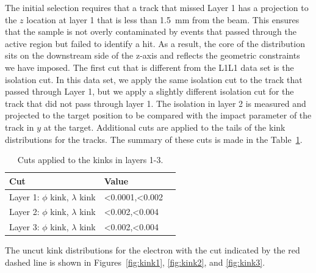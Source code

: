 The initial selection requires that a track that missed Layer 1 has a projection to the $z$ location at layer 1 that is less than 1.5~mm from the beam. This ensures that the sample is not overly contaminated by events that passed through the active region but failed to identify a hit. As a result, the core of the distribution sits on the downstream side of the z-axis and reflects the geometric constraints we have imposed. The first cut that is different from the L1L1 data set is the isolation cut. In this data set, we apply the same isolation cut to the track that passed through Layer 1, but we apply a slightly different isolation cut for the track that did not pass through layer 1. The isolation in layer 2 is measured and projected to the target position to be compared with the impact parameter of the track in $y$ at the target. Additional cuts are applied to the tails of the kink distributions for the tracks. The summary of these cuts is made in the Table~\ref{kink_cuts}.

\begin{table}[H]
\caption{Cuts applied to the kinks in layers 1-3.}
\label{kink_cuts}
\centering
\begin{tabular}{lll}
\toprule
Cut & Value \\
\midrule
Layer 1: $\phi$ kink, $\lambda$ kink & <0.0001,<0.002\\
Layer 2: $\phi$ kink, $\lambda$ kink & <0.002,<0.004\\
Layer 3: $\phi$ kink, $\lambda$ kink & <0.002,<0.004\\
\bottomrule
\end{tabular}
\end{table}

The uncut kink distributions for the electron with the cut indicated by the red dashed line is shown in Figures~\ref{fig:kink1}, \ref{fig:kink2}, and \ref{fig:kink3}.

